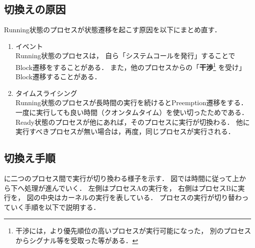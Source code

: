 \subsection{切換えの原因}
Running状態のプロセスが状態遷移を起こす原因を以下にまとめ直す．

\begin{enumerate}
\item イベント \\
Running状態のプロセスは，
自ら「システムコールを発行」することでBlock遷移をすることがある．
また，他のプロセスからの「{\bf 干渉}\footnote{
干渉には，より優先順位の高いプロセスが実行可能になった，
別のプロセスからシグナル等を受取った等がある．}
を受け」Block遷移することがある．

\item タイムスライシング \\
Running状態のプロセスが長時間の実行を続けるとPreemption遷移をする．
一度に実行しても良い時間（クオンタムタイム）を使い切ったためである．
Ready状態のプロセスが他にあれば，そのプロセスに実行が切換わる．
他に実行すべきプロセスが無い場合は，再度，同じプロセスが実行される．
\end{enumerate}

\subsection{切換え手順}
に二つのプロセス間で実行が切り換わる様子を示す．
図では時間に従って上から下へ処理が進んでいく．
左側はプロセスAの実行を，
右側はプロセスBに実行を，
図の中央はカーネルの実行を表している．
プロセスの実行が切り替わっていく手順を以下で説明する．

